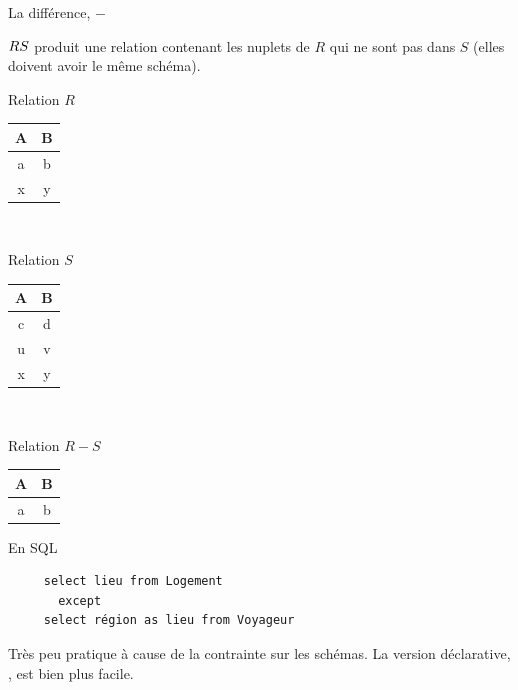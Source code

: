 \begin{frame}[fragile]{La différence, $-$}

$R \- S$ produit 
une relation contenant les nuplets de $R$ qui ne sont pas
dans $S$ (elles doivent avoir le même schéma).

\vfill

\begin{minipage}[t]{4cm}
\begin{center}
Relation $R$
\begin{tabular}{c|c}
A & B \\ \hline
a & b  \\
x & y  \\\hline 
\end{tabular}

\end{center}
\end{minipage} \
\begin{minipage}[t]{4cm}
\begin{center}
Relation $S$
\begin{tabular}{c|c}
A & B\\ \hline
c & d  \\ 
u & v  \\
x & y  \\\hline 
\end{tabular}
\end{center}
\end{minipage} 
\
\begin{minipage}[t]{4cm}
\begin{center}
Relation $R - S$
\begin{tabular}{c|c}
A & B\\ \hline
a & b  \\\hline 
\end{tabular}

\end{center}
\end{minipage} 
\vfill

\vfill 
En SQL


\begin{verbatim}
     select lieu from Logement
       except
     select région as lieu from Voyageur
\end{verbatim}

\vfill
\begin{blocgauche}
Très peu pratique à cause de la contrainte sur les schémas. La
version déclarative, , est bien plus facile.
\end{blocgauche}

\end{frame}

